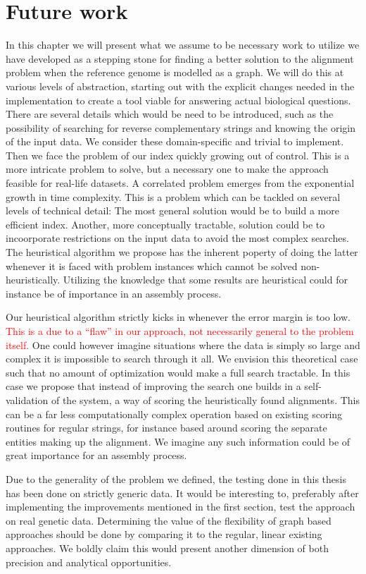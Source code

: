 \documentclass[thesis.tex]{subfiles}
\begin{document}
\chapter{Future work}
\label{sec:future_work}
In this chapter we will present what we assume to be necessary work to utilize we have developed as a stepping stone for finding a better solution to the alignment problem when the reference genome is modelled as a graph. We will do this at various levels of abstraction, starting out with the explicit changes needed in the implementation to create a tool viable for answering actual biological questions. There are several details which would be need to be introduced, such as the possibility of searching for reverse complementary strings and knowing the origin of the input data. We consider these domain-specific and trivial to implement. Then we face the problem of our index quickly growing out of control. This is a more intricate problem to solve, but a necessary one to make the approach feasible for real-life datasets. A correlated problem emerges from the exponential growth in time complexity. This is a problem which can be tackled on several levels of technical detail: The most general solution would be to build a more efficient index. Another, more conceptually tractable, solution could be to incoorporate restrictions on the input data to avoid the most complex searches. The heuristical algorithm we propose has the inherent poperty of doing the latter whenever it is faced with problem instances which cannot be solved non-heuristically. Utilizing the knowledge that some results are heuristical could for instance be of importance in an assembly process.\\
\par\noindent
Our heuristical algorithm strictly kicks in whenever the error margin is too low. \textcolor{red}{This is a due to a ``flaw'' in our approach, not necessarily general to the problem itself.} One could however imagine situations where the data is simply so large and complex it is impossible to search through it all. We envision this theoretical case such that no amount of optimization would make a full search tractable. In this case we propose that instead of improving the search one builds in a self-validation of the system, a way of scoring the heuristically found alignments. This can be a far less computationally complex operation based on existing scoring routines for regular strings, for instance based around scoring the separate entities making up the alignment. We imagine any such information could be of great importance for an assembly process.\\
\par\noindent
Due to the generality of the problem we defined, the testing done in this thesis has been done on strictly generic data. It would be interesting to, preferably after implementing the improvements mentioned in the first section, test the approach on real genetic data. Determining the value of the flexibility of graph based approaches should be done by comparing it to the regular, linear existing approaches. We boldly claim this would present another dimension of both precision and analytical opportunities.
\end{document}

